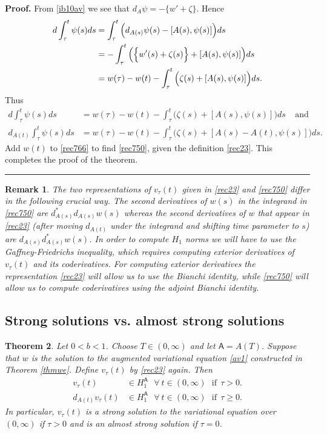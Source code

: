 \documentclass[12pt]{article}
\newtheorem{theorem}{Theorem}[section]
\newtheorem{remark}[theorem]{Remark}
\newenvironment{proof}[1][Proof]{\textbf{#1.} }{\ \rule{0.5em}{0.5em}}
\def \({\Big(}
\def \){\Big)}
\def \As{\mathsf{A}}
\def \eref{\eqref}
\numberwithin{equation}{section}
\begin{document}
\begin{proof}
From \eref{ib10av} we see that   $ d_A \psi = -\{ w' + \zeta\}$.
 Hence 
 \begin{align}
 d\int_\tau^t  \psi(s) ds &=\int_\tau^t \Big(d_{A(s)}\psi(s)   -[A(s), \psi(s)]\Big) ds  \notag\\
&= -\int_\tau^t \Big( \Big\{w'(s) + \zeta(s) \Big\} +[A(s), \psi(s)]\)ds \notag\\
 &=w(\tau) - w(t) -\int_\tau^t \(\zeta(s) +[A(s), \psi(s)]\) ds.    \notag 
 \end{align}
 Thus
 \begin{align}
 d\int_\tau^t  \psi(s) ds & =w(\tau) - w(t) -\int_\tau^t \(\zeta(s) +[A(s), \psi(s)]\) ds\ \ \ \ \ \text{and} \label{rec767}  \\
 d_{A(t)}\int_\tau^t  \psi(s) ds  &=w(\tau) - w(t) -\int_\tau^t \(\zeta(s) +[A(s)-A(t), \psi(s)]\) ds. \label{rec766}
 \end{align}
 Add $w(t)$ to  \eref{rec766} to find \eref{rec750}, given the definition \eref{rec23}. 
This completes the proof of the theorem.
\end{proof}




\begin{remark}{\rm The two representations of $v_\tau(t)$ given in \eref{rec23} and \eref{rec750} differ
in the following crucial way. The second derivatives of $w(s)$ in the integrand in \eref{rec750}
are $d_{A(s)}^* d_{A(s)} w(s)$ whereas the second derivatives of $w$ that appear in \eref{rec23}
(after moving $d_{A(t)}$ under the integrand and shifting time parameter to $s$) are 
$d_{A(s)} d_{A(s)}^* w(s)$. In order to compute $H_1$ norms we will have to use the Gaffney-Friedrichs
inequality, which requires computing exterior derivatives of $v_\tau(t)$ and its coderivatives. 
For computing exterior derivatives
the representation \eref{rec23} will allow us to use the Bianchi identity, while \eref{rec750} will allow
us to compute coderivatives using the adjoint Bianchi identity. 
}
\end{remark}



\subsection{Strong solutions vs. almost strong solutions} \label{secsas}        
  \begin{theorem}\label{thmrec10}     
 Let $ 0 < b <1$.  Choose $T \in (0, \infty)$ and let $\As = A(T)$. Suppose that $w$  is the solution to the augmented variational equation \eref{av1}
 constructed in Theorem \ref{thmwe}.   
 Define $v_\tau(t)$ by \eref{rec23} again.
   Then   
   \begin{align}
   v_\tau(t) &\in  H_1^\As \ \ \ \forall\  t \in (0,  \infty)\ \ \ \text{if}\ \ \tau >0.  \label{rec777}\\
   d_{A(t)} v_\tau(t) &\in H_1^\As \ \ \ \forall\  t \in (0, \infty)\ \ \ \text{if}\ \ \tau \ge 0.   \label{rec776}
   \end{align}
   In particular, $v_\tau(t)$ is a strong solution to the variational equation 
   over $(0,\infty)$ if $\tau >0$ and is
   an almost strong solution if $\tau =0$.  
 \end{theorem}
 
\end{document}
